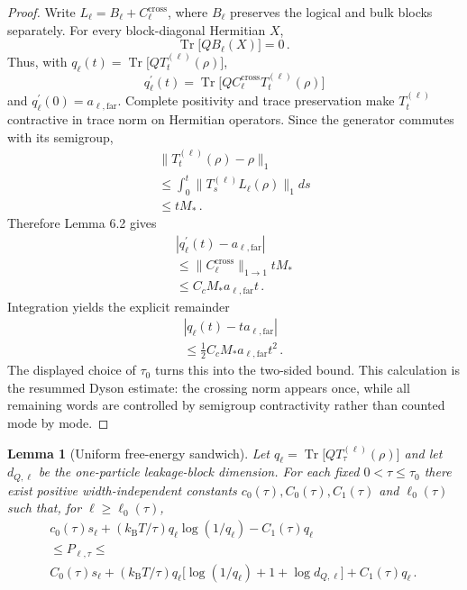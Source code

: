 \documentclass[11pt,a4paper]{article}
\newtheorem{lemma}[theorem]{Lemma}
\theoremstyle{remark}
\begin{document}
\begin{proof}
Write $L_\ell=B_\ell+C_\ell^{\mathrm{cross}}$, where $B_\ell$ preserves the logical and bulk blocks separately. For every block-diagonal Hermitian $X$,
\[
\operatorname{Tr}\bigl[Q B_\ell(X)\bigr]=0\mathpunct{.}
\]
Thus, with $q_\ell(t)=\operatorname{Tr}\bigl[Q T_t^{(\ell)}(\rho)\bigr]$,
\[
q_\ell^{\prime}(t)=\operatorname{Tr}\bigl[Q C_\ell^{\mathrm{cross}} T_t^{(\ell)}(\rho)\bigr]
\]
and $q_\ell^{\prime}(0)=a_{\ell,\mathrm{far}}$. Complete positivity and trace preservation make $T_t^{(\ell)}$ contractive in trace norm on Hermitian operators. Since the generator commutes with its semigroup,
\[
\begin{gathered}
\lVert T_t^{(\ell)}(\rho)-\rho\rVert_1 \\
\le \int_{0}^{t} \lVert T_s^{(\ell)}L_\ell(\rho)\rVert_1 ds \\
\le t M_*\mathpunct{.}
\end{gathered}
\]
Therefore Lemma 6.2 gives
\[
\begin{gathered}
|q_\ell^{\prime}(t)-a_{\ell,\mathrm{far}}| \\
\le \lVert C_\ell^{\mathrm{cross}}\rVert_{1\to 1} t M_* \\
\le C_c M_* a_{\ell,\mathrm{far}} t\mathpunct{.}
\end{gathered}
\]
Integration yields the explicit remainder
\[
\begin{gathered}
|q_\ell(t)-t a_{\ell,\mathrm{far}}| \\
\le \frac{1}{2}C_c M_* a_{\ell,\mathrm{far}} t^{2}\mathpunct{.}
\end{gathered}
\]
The displayed choice of $\tau_0$ turns this into the two-sided bound. This calculation is the resummed Dyson estimate: the crossing norm appears once, while all remaining words are controlled by semigroup contractivity rather than counted mode by mode.
\end{proof}
\begin{lemma}[Uniform free-energy sandwich]
Let $q_\ell=\operatorname{Tr}\bigl[Q T_\tau^{(\ell)}(\rho)\bigr]$ and let $d_{Q,\ell}$ be the one-particle leakage-block dimension. For each fixed $0<\tau\le \tau_0$ there exist positive width-independent constants $c_0(\tau),C_0(\tau),C_1(\tau)$ and $\ell_0(\tau)$ such that, for $\ell\ge \ell_0(\tau)$,
\[
\begin{gathered}
c_0(\tau) s_\ell+(k_{\mathrm B} T/\tau)q_\ell \log(1/q_\ell)-C_1(\tau) q_\ell \\
\le P_{\ell,\tau}\le  \\
C_0(\tau) s_\ell+(k_{\mathrm B} T/\tau)q_\ell\bigl[\log(1/q_\ell)+1+\log d_{Q,\ell}\bigr]+C_1(\tau) q_\ell\mathpunct{.}
\end{gathered}
\]
\end{lemma}
\end{document}

